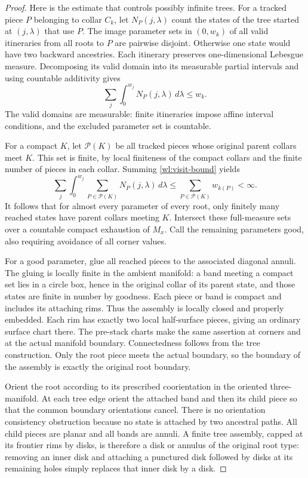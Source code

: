 \documentclass[11pt]{article}
\numberwithin{equation}{section}
\theoremstyle{definition}
\theoremstyle{remark}
\begin{document}
\begin{proof}
Here is the estimate that controls possibly infinite trees.  For a tracked
piece $P$ belonging to collar $C_k$, let $N_P(j,\lambda)$ count the states
of the tree started at $(j,\lambda)$ that use $P$.  The image parameter sets
in $(0,w_k)$ of all valid itineraries from all roots to $P$ are pairwise
disjoint.  Otherwise one state would have two backward ancestries.  Each
itinerary preserves one-dimensional Lebesgue measure.  Decomposing its
valid domain into its measurable partial intervals and using countable
additivity gives
\begin{equation}
\label{wl:visit-bound}
             \sum_j\int_0^{w_j} N_P(j,\lambda)\,d\lambda\leq w_k.
\end{equation}
The valid domains are measurable: finite itineraries impose affine interval
conditions, and the excluded parameter set is countable.

For a compact $K$, let $\mathcal P(K)$ be all tracked pieces whose original
parent collars meet $K$.  This set is finite, by local finiteness of the
compact collars and the finite number of pieces in each collar.  Summing
\eqref{wl:visit-bound} yields
\[
 \sum_j\int_0^{w_j}
      \sum_{P\in\mathcal P(K)}N_P(j,\lambda)\,d\lambda
       \leq\sum_{P\in\mathcal P(K)}w_{k(P)}<\infty.
\]
It follows that for almost every parameter of every root, only finitely
many reached states have parent collars meeting $K$.  Intersect these
full-measure sets over a countable compact exhaustion of $M_x$.  Call the
remaining parameters good, also requiring avoidance of all corner values.

For a good parameter, glue all reached pieces to the associated diagonal
annuli.  The gluing is locally finite in the ambient manifold: a band meeting
a compact set lies in a circle box, hence in the original collar of its
parent state, and those states are finite in number by goodness.  Each
piece or band is compact and includes its attaching rims.  Thus the assembly
is locally closed and properly embedded.  Each rim has exactly two local
half-surface pieces, giving an ordinary surface chart there.  The pre-stack
charts make the same assertion at corners and at the actual manifold
boundary.  Connectedness follows from the tree construction.  Only the root
piece meets the actual boundary, so the boundary of the assembly is exactly
the original root boundary.

Orient the root according to its prescribed coorientation in the oriented
three-manifold.  At each tree edge orient the attached band and then its
child piece so that the common boundary orientations cancel.  There is no
orientation consistency obstruction because no state is attached by two
ancestral paths.  All child pieces are planar and all bands are annuli.
A finite tree assembly, capped at its frontier rims by disks, is therefore
a disk or annulus of the original root type: removing an inner disk and
attaching a punctured disk followed by disks at its remaining holes simply
replaces that inner disk by a disk.


\end{proof}
\end{document}
